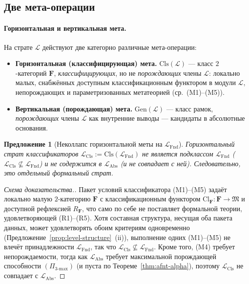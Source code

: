 \documentclass[11pt]{article}
\theoremstyle{plain}
\newtheorem{proposition}[theorem]{Предложение}
\theoremstyle{definition}
\newcommand{\fM}{\mathfrak{M}}
\newcommand{\LFnd}{\mathcal{L}_{\mathrm{Fnd}}}
\newcommand{\LCls}{\mathcal{L}_{\mathrm{Cls}}}
\newcommand{\LAbs}{\mathcal{L}_{\mathrm{Abs}}}
\newcommand{\Cl}{\mathrm{Cl}}
\begin{document}
\subsection{Две мета-операции}\label{sec:indexing-scheme}

\paragraph{Горизонтальная и вертикальная мета.} На страте $\mathcal{L}$ действуют две категорно различные мета-операции:
\begin{itemize}
\item \textbf{Горизонтальная (классифицирующая) мета.} $\mathrm{Cls}(\mathcal{L})$ — класс $2$-категорий $\mathbf{F}$, \emph{классифицирующих}, но не \emph{порождающих} члены $\mathcal{L}$: локально малых, снабжённых доступным классификационным функтором в модули $\mathcal{L}$, непорождающих и параметризованных метатеорией (ср.\ (M1)--(M5)).
\item \textbf{Вертикальная (порождающая) мета.} $\mathrm{Gen}(\mathcal{L})$ — класс рамок, \emph{порождающих} члены $\mathcal{L}$ как внутренние выводы --- кандидаты в абсолютные основания.
\end{itemize}

\begin{proposition}[Неколлапс горизонтальной меты на $\LFnd$]\label{prop:no-collapse}
Горизонтальный страт классификаторов $\LCls := \mathrm{Cls}(\LFnd)$ не является подклассом $\LFnd$ ($\LCls \not\subseteq \LFnd$) и не содержится в $\LAbs$ (и не совпадает с ней). Следовательно, это отдельный формальный страт.
\end{proposition}

\begin{proof}[Схема доказательства.]
Пакет условий классификатора (M1)--(M5) задаёт локально малую $2$-категорию $\mathbf{F}$ с классификационным функтором $\Cl_{\mathbf{F}} : \mathbf{F} \to \fM$ и доступной рефлексией $R_{\mathbf{F}}$, что само по себе не поставляет формальной теории, удовлетворяющей (R1)--(R5). Хотя составная структура, несущая оба пакета данных, может удовлетворять обоим критериям одновременно (Предложение~\ref{prop:level-structure}~(ii)), выполнение одних (M1)--(M5) не влечёт принадлежности $\LFnd$, так что $\LCls \not\subseteq \LFnd$. Кроме того, (M4) требует непорождаемости, тогда как $\LAbs$ требует максимальной порождающей способности $(\Pi_{3\text{-max}})$ (и пуста по Теореме~\ref{thm:afnt-alpha}), поэтому $\LCls$ не совпадает с $\LAbs$.
\end{proof}
\end{document}
